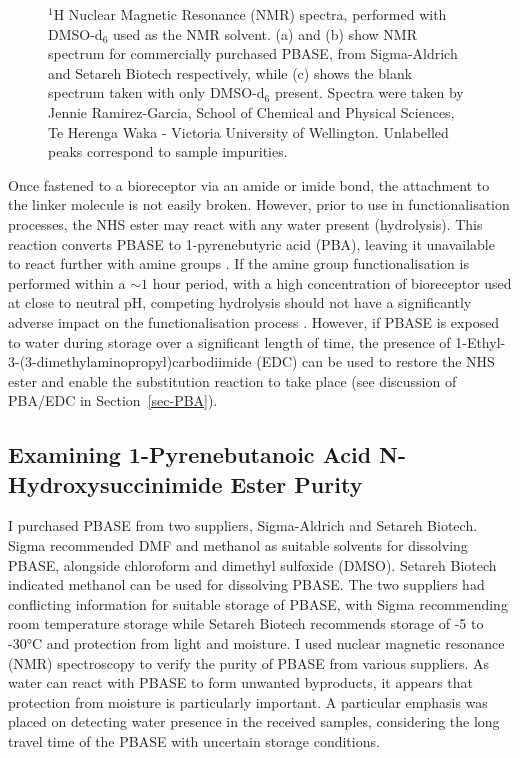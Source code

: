 \documentclass[
  a4paper,
]{scrbook}
\begin{document}
\begin{figure}
\begin{minipage}[t]{\linewidth}
{{}

}

\subcaption{\label{fig-dmso-nmr}}
\end{minipage}%

\caption{\label{fig-pbase-nmr}\(^{1}\)H Nuclear Magnetic Resonance (NMR)
spectra, performed with DMSO-d\(_6\) used as the NMR solvent. (a) and
(b) show NMR spectrum for commercially purchased PBASE, from
Sigma-Aldrich and Setareh Biotech respectively, while (c) shows the
blank spectrum taken with only DMSO-d\(_6\) present. Spectra were taken
by Jennie Ramirez-Garcia, School of Chemical and Physical Sciences, Te
Herenga Waka - Victoria University of Wellington. Unlabelled peaks
correspond to sample impurities.}

\end{figure}

Once fastened to a bioreceptor via an amide or imide bond, the
attachment to the linker molecule is not easily broken. However, prior
to use in functionalisation processes, the NHS ester may react with any
water present (hydrolysis). This reaction converts PBASE to
1-pyrenebutyric acid (PBA), leaving it unavailable to react further with
amine groups \autocite{Hermanson2013-3,Hermanson2013-5,Mishyn2022}. If
the amine group functionalisation is performed within a \(\sim1\) hour
period, with a high concentration of bioreceptor used at close to
neutral pH, competing hydrolysis should not have a significantly adverse
impact on the functionalisation process \autocite{Hermanson2013-3}.
However, if PBASE is exposed to water during storage over a significant
length of time, the presence of
1-Ethyl-3-(3-dimethylaminopropyl)carbodiimide (EDC) can be used to
restore the NHS ester and enable the substitution reaction to take place
(see discussion of PBA/EDC in Section~\ref{sec-PBA}).

\hypertarget{examining-1-pyrenebutanoic-acid-n-hydroxysuccinimide-ester-purity}{%
\subsection{Examining 1-Pyrenebutanoic Acid N-Hydroxysuccinimide Ester
Purity}\label{examining-1-pyrenebutanoic-acid-n-hydroxysuccinimide-ester-purity}}

I purchased PBASE from two suppliers, Sigma-Aldrich and Setareh Biotech.
Sigma recommended DMF and methanol as suitable solvents for dissolving
PBASE, alongside chloroform and dimethyl sulfoxide (DMSO). Setareh
Biotech indicated methanol can be used for dissolving PBASE. The two
suppliers had conflicting information for suitable storage of PBASE,
with Sigma recommending room temperature storage while Setareh Biotech
recommends storage of -5 to -30°C and protection from light and
moisture. I used nuclear magnetic resonance (NMR) spectroscopy to verify
the purity of PBASE from various suppliers. As water can react with
PBASE to form unwanted byproducts, it appears that protection from
moisture is particularly important. A particular emphasis was placed on
detecting water presence in the received samples, considering the long
travel time of the PBASE with uncertain storage conditions.
\end{document}
